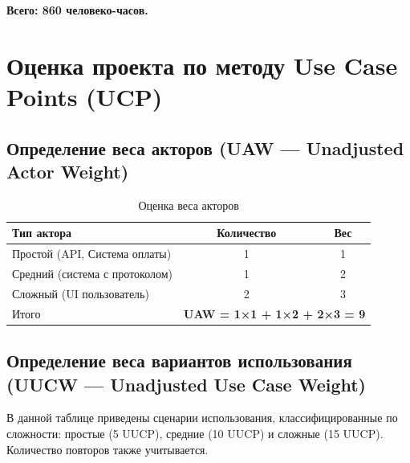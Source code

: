 \documentclass[14pt, russian]{matmex-diploma-custom}
\begin{document}
\textbf{Всего: 860 человеко-часов.}


\section{Оценка проекта по методу Use Case Points (UCP)}

\subsection{Определение веса акторов (UAW — Unadjusted Actor Weight)}

\begin{table}[h!]
    \centering
    \begin{tabular}{|l|c|c|}
    \hline
    Тип актора & Количество & Вес \\
    \hline
    Простой (API, Система оплаты) & 1 & 1 \\
    Средний (система с протоколом) & 1 & 2 \\
    Сложный (UI пользователь) & 2 & 3 \\
    \hline
    Итого & \multicolumn{2}{c|}{\textbf{UAW = 1×1 + 1×2 + 2×3 = 9}} \\
    \hline
    \end{tabular}
    \caption{Оценка веса акторов}
\end{table}


\subsection{Определение веса вариантов использования (UUCW — Unadjusted Use Case Weight)}

В данной таблице приведены сценарии использования, классифицированные по сложности: простые (5 UUCP), средние (10 UUCP) и сложные (15 UUCP).
Количество повторов также учитывается.
\end{document}
